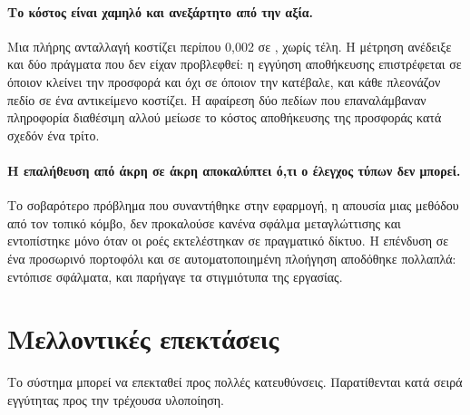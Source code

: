 \paragraph{Το κόστος είναι χαμηλό και ανεξάρτητο από την αξία.} Μια πλήρης ανταλλαγή
κοστίζει περίπου 0{,}002  σε , χωρίς τέλη. Η μέτρηση ανέδειξε και δύο
πράγματα που δεν είχαν προβλεφθεί: η εγγύηση αποθήκευσης επιστρέφεται σε όποιον κλείνει την
προσφορά και όχι σε όποιον την κατέβαλε, και κάθε πλεονάζον πεδίο σε ένα αντικείμενο
κοστίζει. Η αφαίρεση δύο πεδίων που επαναλάμβαναν πληροφορία διαθέσιμη αλλού μείωσε το
κόστος αποθήκευσης της προσφοράς κατά σχεδόν ένα τρίτο.

\paragraph{Η επαλήθευση από άκρη σε άκρη αποκαλύπτει ό,τι ο έλεγχος τύπων δεν μπορεί.}
Το σοβαρότερο πρόβλημα που συναντήθηκε στην εφαρμογή, η απουσία μιας μεθόδου από τον
τοπικό κόμβο, δεν προκαλούσε κανένα σφάλμα μεταγλώττισης και εντοπίστηκε μόνο όταν οι ροές
εκτελέστηκαν σε πραγματικό δίκτυο. Η επένδυση σε ένα προσωρινό πορτοφόλι και σε
αυτοματοποιημένη πλοήγηση αποδόθηκε πολλαπλά: εντόπισε σφάλματα, και παρήγαγε τα
στιγμιότυπα της εργασίας.

\section{Μελλοντικές επεκτάσεις}
\label{sec:future}

Το σύστημα μπορεί να επεκταθεί προς πολλές κατευθύνσεις. Παρατίθενται κατά σειρά
εγγύτητας προς την τρέχουσα υλοποίηση.

